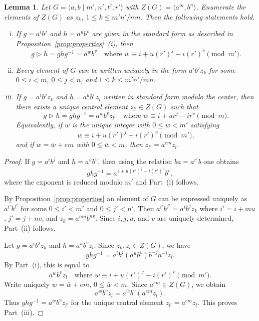 \documentclass[a4paper,12pt]{article}
\newtheorem{lem}[thm]{Lemma}
\theoremstyle{definition}
\theoremstyle{remark}
\begin{document}
\begin{lem}\label{lem:rep}
Let $G = \langle a,b\mid m',n',t',r'\rangle$ with $Z(G) = \langle a^m,b^n\rangle$. Enumerate the elements of $Z(G)$ as $z_k$, $1\leq k \leq m'n'/mn$. Then the following statements hold.
\begin{enumerate}[(i)]
\item If $g=a^ib^j$ and $h=a^ub^v$ are given in the standard form as described in Proposition~\ref{prop:properties}~(i), then
  $$ g\triangleright h = ghg^{-1} = a^wb^v\quad \text{where } w\equiv i + u(r')^j - i(r')^v \pmod{m'}. $$ 
\item Every element of $G$ can be written uniquely in the form $a^ib^jz_k$ for some $0\leq i < m$, $0\leq j < n$, and $1\leq k \leq m'n'/mn$.
\item If $g=a^ib^jz_k$ and $h=a^ub^vz_l$ written in standard form modulo the center, then there exists a unique central element $z_{l'}\in Z(G)$ such that
  $$ g\triangleright h=ghg^{-1} = a^{\bar{w}}b^vz_{l'}\quad \text{where } \bar{w}\equiv i + ur^j - ir^v \pmod{m}. $$
  Equivalently, if $w$ is the unique integer with $0\leq w<m'$ satisfying $$ w\equiv i+u(r')^j-i(r')^v \pmod{m'}, $$ and if $w=\bar{w} + em$ with $0\leq \bar{w} < m$, then $z_{l'}=a^{em}z_l$.
\end{enumerate}
\end{lem}

\begin{proof}
  If $g=a^ib^j$ and $h=a^ub^v$, then using the relation $ba=a^{r'}b$ one obtains $$ ghg^{-1}=a^{\,i+u(r')^j-i(r')^v}b^v, $$ where the exponent is reduced modulo $m'$ and Part~(i) follows.
  
  By Proposition~\ref{prop:properties} an element of $G$ can be expressed uniquely as $a^{i'}b^{j'}$ for some $0\leq i' < m'$ and $0\leq j' < n'$. Then $a^{i'}b^{j'} = a^ib^jz_k$ where $i' = i + mu$, $j' = j + nv$, and $z_k = a^{mu}b^{nv}$. Since $i,j,u$, and $v$ are uniquely determined, Part~(ii) follows.

  Let $g=a^i b^j z_k$ and $h=a^u b^v z_l$. Since $z_k,z_l\in Z(G)$, we have $$ ghg^{-1}=a^ib^j(a^u b^v)b^{-j}a^{-i}z_l. $$ By Part~(i), this is equal to
  $$ a^w b^v z_l\quad \text{where } w\equiv i+u(r')^j-i(r')^v \pmod{m'}. $$
  Write uniquely $w = \bar{w} + em$, $0\leq \bar w < m$. Since $a^{em}\in Z(G)$, we obtain
  $$ a^w b^v z_l = a^{\bar w} b^v (a^{em}z_l). $$
  Thus $ghg^{-1} = a^{\bar{w}}b^vz_{l'}$ for the unique central element $z_{l'}=a^{em}z_l$. This proves Part~(iii).
\end{proof}
\end{document}
